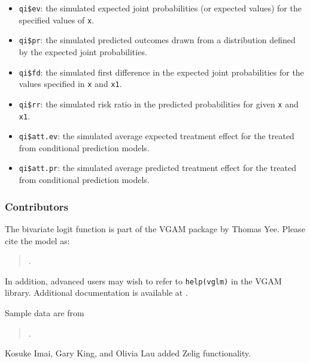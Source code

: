 \begin{itemize}
   \begin{itemize}
   \item {\tt qi\$ev}: the simulated expected joint probabilities (or expected
     values) for the specified values of {\tt x}.  
   \item {\tt qi\$pr}: the simulated predicted outcomes drawn from a
     distribution defined by the expected joint probabilities.
   \item {\tt qi\$fd}: the simulated first difference in the
     expected joint probabilities for the values specified in {\tt x} and
     {\tt x1}.
   \item {\tt qi\$rr}: the simulated risk ratio in the predicted
     probabilities for given {\tt x} and {\tt x1}.
   \item {\tt qi\$att.ev}: the simulated average expected treatment
     effect for the treated from conditional prediction models.  
   \item {\tt qi\$att.pr}: the simulated average predicted treatment
     effect for the treated from conditional prediction models.  
   \end{itemize}
\end{itemize}

\subsubsection{Contributors}

The bivariate logit function is part of the VGAM package by Thomas Yee.
Please cite the model as:

\begin{verse}
.
\end{verse}

In addition, advanced users may wish to refer to \texttt{help(vglm)} 
in the VGAM library.  Additional
documentation is available at
.

Sample data are from
\begin{verse}
.
\end{verse}
Kosuke Imai, Gary King, and Olivia Lau added Zelig functionality.  






